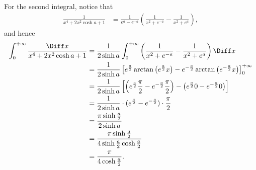 \begin{enumerate}
          For the second integral, notice that
          \begin{align*}
              \frac{1}{x^4 + 2x^2 \cosh a + 1} & = \frac{1}{e^a - e^{-a}} \left(\frac{1}{x^2 + e^{-a}} - \frac{1}{x^2 + e^{a}}\right),
          \end{align*}
          and hence
          \begin{align*}
              \int_{0}^{+\infty} \frac{\Diff x}{x^4 + 2x^2 \cosh a + 1} & = \frac{1}{2 \sinh a} \int_{0}^{+\infty} \left(\frac{1}{x^2 + e^{-a}} - \frac{1}{x^2 + e^{a}}\right) \Diff x                                                         \\
                                                                        & = \frac{1}{2 \sinh a} \left[e^{\frac{a}{2}} \arctan \left(e^{\frac{a}{2}} x\right) - e^{-\frac{a}{2}} \arctan \left(e^{-\frac{a}{2}} x\right) \right]_{0}^{+\infty}  \\
                                                                        & = \frac{1}{2 \sinh a} \left[\left(e^{\frac{a}{2}} \frac{\pi}{2} - e^{-\frac{a}{2}} \frac{\pi}{2}\right) - \left(e^{\frac{a}{2}} 0 - e^{-\frac{a}{2}} 0\right)\right] \\
                                                                        & = \frac{1}{2 \sinh a} \cdot (e^{\frac{a}{2}} - e^{-\frac{a}{2}}) \cdot \frac{\pi}{2}                                                                                 \\
                                                                        & = \frac{\pi \sinh \frac{a}{2}}{2 \sinh a}                                                                                                                            \\
                                                                        & = \frac{\pi \sinh \frac{a}{2}}{4 \sinh \frac{a}{2} \cosh \frac{a}{2}}                                                                                                \\
                                                                        & = \frac{\pi}{4 \cosh \frac{a}{2}}.
          \end{align*}
\end{enumerate}